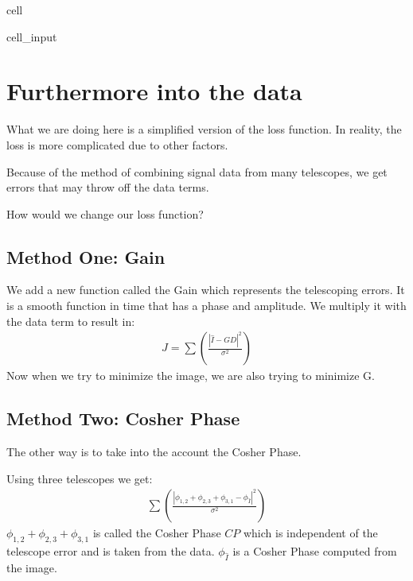 \documentclass[letterpaper,10pt,english]{jupyterBook}
\begin{document}
\begin{sphinxuseclass}{cell}
\begin{sphinxVerbatimInput}
\begin{sphinxuseclass}{cell_input}
\begin{sphinxVerbatim}[commandchars=\\\{\}]
           
\end{sphinxVerbatim}

\end{sphinxuseclass}\end{sphinxVerbatimInput}

\end{sphinxuseclass}

\section{Furthermore into the data}
\label{\detokenize{loss:furthermore-into-the-data}}
\sphinxAtStartPar
What we are doing here is a simplified version of the loss function. In reality, the loss is more complicated due to other factors.

\sphinxAtStartPar
Because of the method of combining signal data from many telescopes, we get errors that may throw off the data terms.

\sphinxAtStartPar
How would we change our loss function?


\subsection{Method One: Gain}
\label{\detokenize{loss:method-one-gain}}
\sphinxAtStartPar
We add a new function called the Gain which represents the telescoping errors. It is a smooth function in time that has a phase and amplitude. We multiply it with the data term to result in:
\begin{equation*}
\begin{split}J = \sum(\frac{|\hat{I} - G D|^2}{\sigma^2})\end{split}
\end{equation*}
\sphinxAtStartPar
Now when we try to minimize the image, we are also trying to minimize G.


\subsection{Method Two: Cosher Phase}
\label{\detokenize{loss:method-two-cosher-phase}}
\sphinxAtStartPar
The other way is to take into the account the Cosher Phase.

\sphinxAtStartPar
Using three telescopes we get:
\begin{equation*}
\begin{split} \sum (\frac{|\phi_{1,2} + \phi_{2,3} + \phi_{3,1} - \phi_{\hat{I}}|^2}{\sigma^2})\end{split}
\end{equation*}
\sphinxAtStartPar
\(\phi_{1,2} + \phi_{2,3} + \phi_{3,1}\) is called the Cosher Phase \(CP\) which is independent of the telescope error and is taken from the data. \(\phi_{\hat{I}}\) is a Cosher Phase computed from the image.
\end{document}
